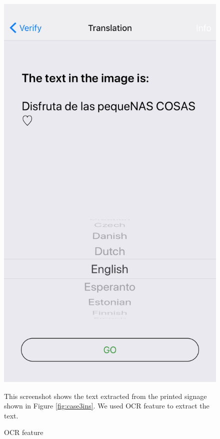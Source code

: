 \documentclass[12pt]{article}
\begin{document}
\begin{figure} [H]
\begin{minipage}{.5\textwidth}
  \includegraphics[width=0.9\linewidth]{media/case3.PNG}
  \caption{OCR feature}{This screenshot shows the text extracted from the printed signage shown in Figure \ref{fig:case3ins}. We used OCR feature to extract the text.}
  \label{fig:case3}
\end{minipage}
\end{figure}
\end{document}
